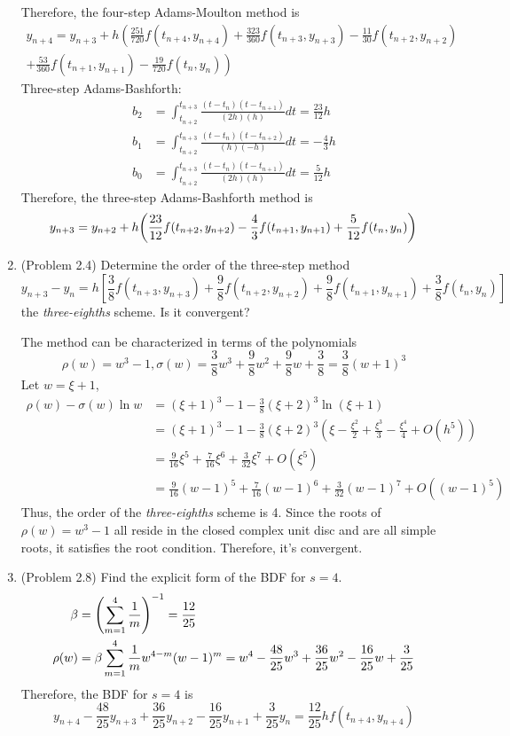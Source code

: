 \documentclass[10pt]{report}
\newcommand{\dintt}[4] {\int_{#1}^{#2} #3 d#4}
\DeclarePairedDelimiter\autoparen{(}{)}
\newcommand{\pa}[1]{\autoparen*{#1}}
\begin{document}
\begin{enumerate}
	Therefore, the four-step Adams-Moulton method is
	\begin{multline*}
	y_{n+4} = y_{n+3} + h \left( \frac{251}{720} f(t_{n+4},y_{n+4}) + \frac{323}{360} f(t_{n+3},y_{n+3}) - \frac{11}{30} f(t_{n+2},y_{n+2}) \right.\\
	\left. + \frac{53}{360} f(t_{n+1},y_{n+1}) - \frac{19}{720} f(t_n,y_n) \right)
	\end{multline*}
	Three-step Adams-Bashforth:
	\begin{align*}
	b_2 &= \dintt{t_{n+2}}{t_{n+3}}{
		\frac{ (t-t_{n})(t-t_{n+1}) }{ (2h)(h) }}{t}
	= \frac{23}{12}h\\
	b_1 &= \dintt{t_{n+2}}{t_{n+3}}{
		\frac{ (t-t_{n})(t-t_{n+2}) }{ (h)(-h) }}{t}
	= -\frac{4}{3}h\\
	b_0 &= \dintt{t_{n+2}}{t_{n+3}}{
		\frac{ (t-t_{n})(t-t_{n+1}) }{ (2h)(h) }}{t}
	= \frac{5}{12}h
	\end{align*}
	Therefore, the three-step Adams-Bashforth method is
	\[
	y_{n+3} = y_{n+2} + h \pa{\frac{23}{12} f(t_{n+2},y_{n+2}) - \frac{4}{3} f(t_{n+1},y_{n+1}) + \frac{5}{12} f(t_n,y_n)}
	\]
	
	\item 
	(Problem 2.4) Determine the order of the three-step method
	\[
	y_{n+3} - y_n = h\left[\frac{3}{8}f(t_{n+3}, y_{n+3})+ \frac{9}{8}f(t_{n+2}, y_{n+2}) + \frac{9}{8}f(t_{n+1}, y_{n+1}) + \frac{3}{8}f(t_{n}, y_{n})\right]
	\]
	the \textit{three-eighths} scheme. Is it convergent?
	
	The method can be characterized in terms of the polynomials
	\[
	\rho(w) = w^3 - 1, \sigma(w) = \frac{3}{8}w^3 + \frac{9}{8}w^2 + \frac{9}{8}w + \frac{3}{8} = \frac{3}{8}(w+1)^3
	\]
	Let $w = \xi + 1$,
	\begin{align*}
	\rho(w) - \sigma(w) \ln{w}
	&=(\xi + 1)^3 - 1 - \frac{3}{8}(\xi+2)^3 \ln(\xi + 1) \\
	&=(\xi + 1)^3 - 1 - \frac{3}{8}(\xi+2)^3 (\xi - \frac{\xi^2}{2} + \frac{\xi^3}{3} - \frac{\xi^4}{4} + O(h^5))\\
	&=\frac{9}{16}\xi^5 + \frac{7}{16}\xi^6 + \frac{3}{32}\xi^7 + O(\xi^5)\\
	&=\frac{9}{16}(w-1)^5 + \frac{7}{16}(w-1)^6 + \frac{3}{32}(w-1)^7 + O((w-1)^5)
	\end{align*}
	Thus, the order of the \textit{three-eighths} scheme is 4. Since the roots of $\rho(w) = w^3 - 1$ all reside in the closed complex unit disc and are all simple roots, it satisfies the root condition. Therefore, it's convergent.
	
	\item 
	(Problem 2.8) Find the explicit form of the BDF for $s = 4$.
	\begin{align*}
	\beta &= \pa{\sum_{m=1}^{4} \frac{1}{m}}^{-1} = \frac{12}{25}\\
	\rho(w) &= \beta \sum_{m=1}^{4} \frac{1}{m} w^{4-m}(w-1)^m = w^4 - \frac{48}{25}w^3 + \frac{36}{25}w^2 - \frac{16}{25}w + \frac{3}{25}
	\end{align*}
	Therefore, the BDF for $s = 4$ is
	\[
	y_{n+4} - \frac{48}{25}y_{n+3} + \frac{36}{25}y_{n+2} - \frac{16}{25}y_{n+1} + \frac{3}{25}y_{n} = \frac{12}{25}hf(t_{n+4}, y_{n+4})
	\]
\end{enumerate}
\end{document}
